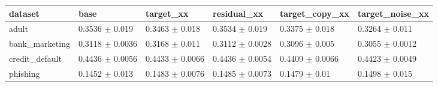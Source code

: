 \begin{tabular}{llllll}
\toprule
dataset & base & target\_xx & residual\_xx & target\_copy\_xx & target\_noise\_xx \\
\midrule
adult & 0.3536 $\pm$ 0.019 & 0.3463 $\pm$ 0.018 & 0.3534 $\pm$ 0.019 & 0.3375 $\pm$ 0.018 & 0.3264 $\pm$ 0.011 \\
bank\_marketing & 0.3118 $\pm$ 0.0036 & 0.3168 $\pm$ 0.011 & 0.3112 $\pm$ 0.0028 & 0.3096 $\pm$ 0.005 & 0.3055 $\pm$ 0.0012 \\
credit\_default & 0.4436 $\pm$ 0.0056 & 0.4433 $\pm$ 0.0066 & 0.4436 $\pm$ 0.0054 & 0.4409 $\pm$ 0.0066 & 0.4423 $\pm$ 0.0049 \\
phishing & 0.1452 $\pm$ 0.013 & 0.1483 $\pm$ 0.0076 & 0.1485 $\pm$ 0.0073 & 0.1479 $\pm$ 0.01 & 0.1498 $\pm$ 0.015 \\
\bottomrule
\end{tabular}

